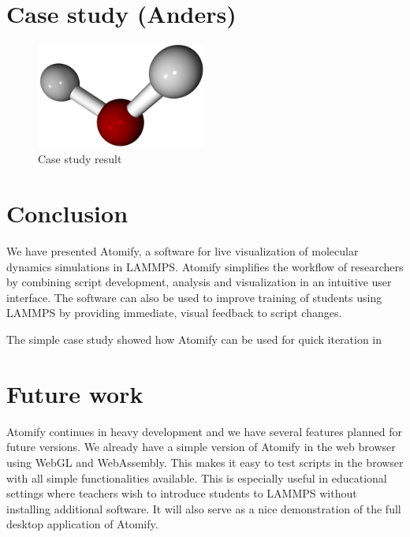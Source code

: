 \documentclass[aps,pre,twocolumn,letterpaper,floatfix,nofootinbib]{revtex4}
\begin{document}


\section{Case study (Anders)}


\begin{figure}
	\centering
	\includegraphics[width=0.5\textwidth]{final_billboard.png}
	\caption{Case study result}
	\label{fig:gui}
\end{figure}

\section{\label{sec:conclusion}Conclusion}
%
We have presented Atomify, a software for live visualization of molecular
dynamics simulations in LAMMPS.
Atomify simplifies the workflow of researchers by combining script development,
analysis and visualization in an intuitive user interface.
The software can also be used to improve training of students using LAMMPS by
providing immediate, visual feedback to script changes.

The simple case study showed how Atomify can be used for quick iteration in 

\section{\label{sec:future}Future work}

Atomify continues in heavy development and we have several features planned for
future versions.
We already have a simple version of Atomify in the web browser using WebGL and WebAssembly.
This makes it easy to test scripts in the browser with all simple functionalities available.
This is especially useful in educational settings where teachers wish to introduce students
to LAMMPS without installing additional software.
It will also serve as a nice demonstration of the full desktop application of
Atomify.
\end{document}
